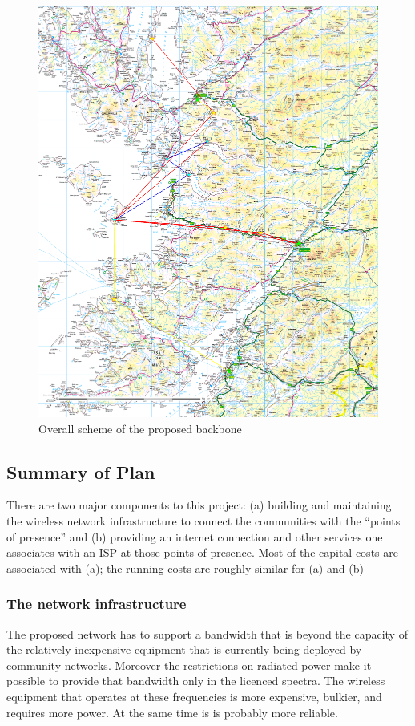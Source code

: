 \begin{figure}
  \begin{center}
    \includegraphics[width=\textwidth]{special/wcb_map.png}
  \end{center}
  \caption{Overall scheme of the proposed backbone}
  \label{longlinks}
\end{figure}

\subsection{Summary of Plan}

There are two major components to this project: (a) building and
maintaining the wireless network infrastructure to connect the
communities with the ``points of presence''  and (b) providing an
internet connection and other services one associates with an ISP at
those points of presence.  Most of the capital costs are associated
with (a); the running costs are roughly similar for (a) and (b)

\subsubsection{The network infrastructure}
The proposed network has to support a bandwidth  that is beyond the
capacity of the relatively inexpensive equipment that is currently
being deployed by community networks.  Moreover the restrictions on
radiated power make it possible to provide that bandwidth only in the
licenced spectra.  The wireless equipment that operates at these
frequencies is  more expensive, bulkier, and requires more power.  At
the same time is is probably more reliable.

